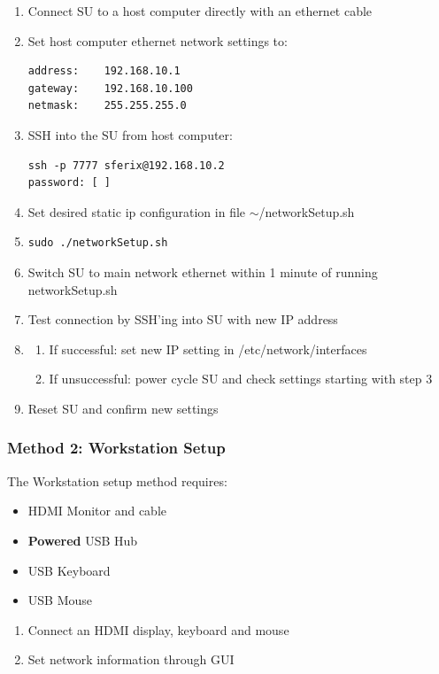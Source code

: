 \begin{enumerate}
\item{Connect SU to a host computer directly with an ethernet cable}
\item{Set host computer ethernet network settings to:
\begin{verbatim}
address:	192.168.10.1
gateway:	192.168.10.100
netmask:	255.255.255.0
\end{verbatim}}
\item{SSH into the SU from host computer:
\begin{verbatim}
ssh -p 7777 sferix@192.168.10.2
password: [	]
\end{verbatim}}
\item{Set desired static ip configuration in file $\sim$/networkSetup.sh}
\item{\begin{verbatim}
sudo ./networkSetup.sh
\end{verbatim}}
\item{Switch SU to main network ethernet within 1 minute of running networkSetup.sh}
\item{Test connection by SSH'ing into SU with new IP address}
\item{
\begin{enumerate}
\item{If successful: set new IP setting in /etc/network/interfaces}
\item{If unsuccessful: power cycle SU and check settings starting with step 3}
\end{enumerate}}
\item{Reset SU and confirm new settings}
\end{enumerate}

\subsubsection{Method 2: Workstation Setup}
The Workstation setup method requires:
\begin{itemize}
\item{HDMI Monitor and cable}
\item{{\bf Powered} USB Hub}
\item{USB Keyboard}
\item{USB Mouse}
\end{itemize}

\begin{enumerate}
\item{Connect an HDMI display, keyboard and mouse}
\item{Set network information through GUI}
\end{enumerate}

